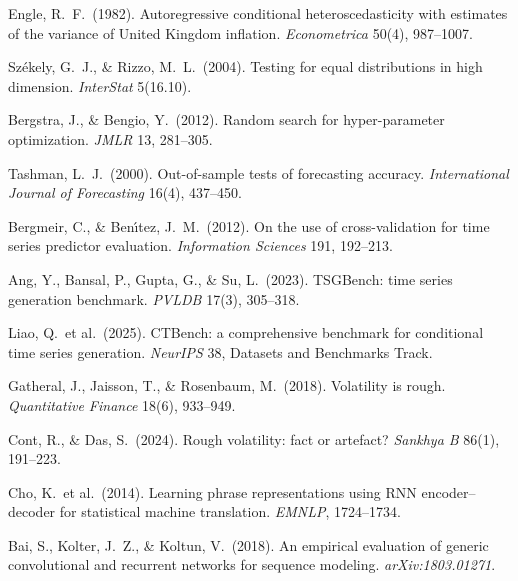 \documentclass[11pt,a4paper]{article}
\makeatletter
\DeclareRobustCommand{\_}{\ifmmode\nfss@text{\textunderscore}\else\textunderscore\allowbreak\fi}
\makeatother
\begin{document}
{\begin{enumerate}[label={\textbf{[\arabic*]}},leftmargin=2.8em,itemsep=4pt,parsep=0pt,topsep=2pt]
\item \hypertarget{R:10}{}%
  Engle, R.\ F.\ (1982). Autoregressive conditional heteroscedasticity with estimates of the variance of United Kingdom inflation. \textit{Econometrica} 50(4), 987--1007.

\item \hypertarget{R:11}{}%
  Sz\'{e}kely, G.\ J., \& Rizzo, M.\ L.\ (2004). Testing for equal distributions in high dimension. \textit{InterStat} 5(16.10).

\item \hypertarget{R:12}{}%
  Bergstra, J., \& Bengio, Y.\ (2012). Random search for hyper-parameter optimization. \textit{JMLR} 13, 281--305.

\item \hypertarget{R:13}{}%
  Tashman, L.\ J.\ (2000). Out-of-sample tests of forecasting accuracy. \textit{International Journal of Forecasting} 16(4), 437--450.

\item \hypertarget{R:14}{}%
  Bergmeir, C., \& Ben\'{\i}tez, J.\ M.\ (2012). On the use of cross-validation for time series predictor evaluation. \textit{Information Sciences} 191, 192--213.

\item \hypertarget{R:15}{}%
  Ang, Y., Bansal, P., Gupta, G., \& Su, L.\ (2023). TSGBench: time series generation benchmark. \textit{PVLDB} 17(3), 305--318.

\item \hypertarget{R:16}{}%
  Liao, Q.\ et al.\ (2025). CTBench: a comprehensive benchmark for conditional time series generation. \textit{NeurIPS} 38, Datasets and Benchmarks Track.

\item \hypertarget{R:17}{}%
  Gatheral, J., Jaisson, T., \& Rosenbaum, M.\ (2018). Volatility is rough. \textit{Quantitative Finance} 18(6), 933--949.

\item \hypertarget{R:18}{}%
  Cont, R., \& Das, S.\ (2024). Rough volatility: fact or artefact? \textit{Sankhya B} 86(1), 191--223.

\item \hypertarget{R:19}{}%
  Cho, K.\ et al.\ (2014). Learning phrase representations using RNN encoder--decoder for statistical machine translation. \textit{EMNLP}, 1724--1734.

\item \hypertarget{R:20}{}%
  Bai, S., Kolter, J.\ Z., \& Koltun, V.\ (2018). An empirical evaluation of generic convolutional and recurrent networks for sequence modeling. \textit{arXiv:1803.01271}.


\end{enumerate}}
\end{document}
